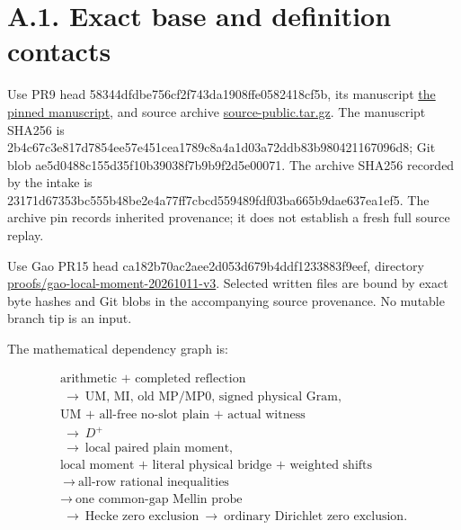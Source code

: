 \documentclass[11pt,a4paper]{article}
\newcommand{\sourcecode}[1]{{\small\ttfamily #1}}
\begin{document}
\hypertarget{a.1.-exact-base-and-definition-contacts}{%
\section{A.1. Exact base and definition
contacts}\label{a.1.-exact-base-and-definition-contacts}}

Use PR9 head \sourcecode{58344dfd\allowbreak{}be756cf2\allowbreak{}f743da19\allowbreak{}08ffe058\allowbreak{}2418cf5b}, its
manuscript
\href{https://github.com/HaileyStorm/QuasiRiemannTracker/blob/58344dfdbe756cf2f743da1908ffe0582418cf5b/proofs/cycle25-quartic-20261010/manuscript/paper.md}{the
pinned manuscript}, and source archive
\href{https://raw.githubusercontent.com/HaileyStorm/QuasiRiemannTracker/58344dfdbe756cf2f743da1908ffe0582418cf5b/public/proofs/cycle25-quartic-20261010/source-public.tar.gz}{source-public.tar.gz}.
The manuscript SHA256 is
\sourcecode{2b4c67c3\allowbreak{}e817d785\allowbreak{}4ee57e45\allowbreak{}1cea1789\allowbreak{}c8a4a1d0\allowbreak{}3a72ddb8\allowbreak{}3b980421\allowbreak{}167096d8}; Git
blob \sourcecode{ae5d0488\allowbreak{}c155d35f\allowbreak{}10b39038\allowbreak{}f7b9b9f2\allowbreak{}d5e00071}. The archive SHA256
recorded by the intake is
\sourcecode{23171d67\allowbreak{}353bc555\allowbreak{}b48be2e4\allowbreak{}a77ff7cb\allowbreak{}cd559489\allowbreak{}fdf03ba6\allowbreak{}65b9dae6\allowbreak{}37ea1ef5}. The
archive pin records inherited provenance; it does not establish a fresh
full source replay.

Use Gao PR15 head \sourcecode{ca182b70\allowbreak{}ac2aee2d\allowbreak{}053d679b\allowbreak{}4ddf1233\allowbreak{}883f9eef},
directory
\href{https://github.com/Gaozhongpai/QuasiRiemannTracker/tree/ca182b70ac2aee2d053d679b4ddf1233883f9eef/proofs/gao-local-moment-20261011-v3}{proofs/gao-local-moment-20261011-v3}.
Selected written files are bound by exact byte hashes and Git blobs in
the accompanying source provenance. No mutable branch tip is an input.

The mathematical dependency graph is:

\[
\begin{gathered}
\text{arithmetic + completed reflection}\\
\ \longrightarrow\ \text{UM, MI, old MP/MP0, signed physical Gram},\\
\text{UM + all-free no-slot plain + actual witness}\\
\ \longrightarrow\ D^+\\
\ \longrightarrow\ \text{local paired plain moment},\\
\text{local moment + literal physical bridge + weighted shifts}\\
\ \longrightarrow\ \text{all-row rational inequalities}\\
\longrightarrow\ \text{one common-gap Mellin probe}\\
\ \longrightarrow\ \text{Hecke zero exclusion}
\ \longrightarrow\ \text{ordinary Dirichlet zero exclusion}.
\end{gathered}
\]
\end{document}
